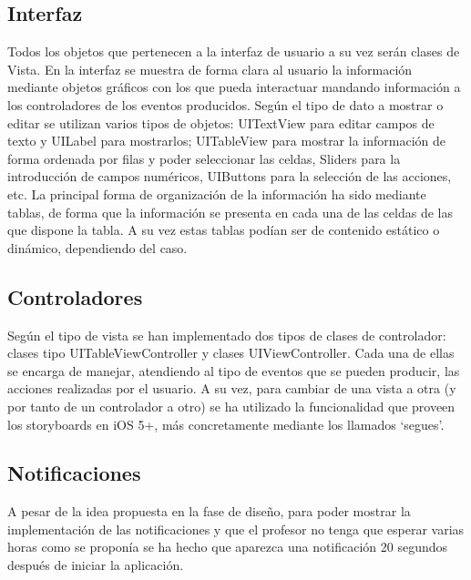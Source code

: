 \documentclass[parskip=half*]{scrartcl}
\begin{document}
\subsection{Interfaz}

Todos los objetos que pertenecen a la interfaz de usuario a su vez ser\'an clases de Vista. En la interfaz se muestra de forma clara al usuario la informaci\'on mediante objetos gr\'aficos con los que pueda interactuar mandando informaci\'on a los controladores de los eventos producidos. Seg\'un el tipo de dato a mostrar o editar se utilizan varios tipos de objetos: UITextView para editar campos de texto y UILabel para mostrarlos; UITableView para mostrar la informaci\'on de forma ordenada por filas y poder seleccionar las celdas, Sliders para la introducci\'on de campos num\'ericos, UIButtons para la selecci\'on de las acciones, etc. La principal forma de organizaci\'on de la informaci\'on ha sido mediante tablas, de forma que la informaci\'on se presenta en cada una de las celdas de las que dispone la tabla. A su vez estas tablas pod\'ian ser de contenido est\'atico o din\'amico, dependiendo del caso.

\subsection{Controladores}

Seg\'un el tipo de vista se han implementado dos tipos de clases de controlador: clases tipo UITableViewController y clases UIViewController. Cada una de ellas se encarga de manejar, atendiendo al tipo de eventos que se pueden producir, las acciones realizadas por el usuario. A su vez, para cambiar de una vista a otra (y por tanto de un controlador a otro) se ha utilizado la funcionalidad que proveen los storyboards en iOS 5+, m\'as concretamente mediante los llamados `segues'.

\subsection{Notificaciones}

A pesar de la idea propuesta en la fase de dise\~no, para poder mostrar la implementaci\'on de las notificaciones y que el profesor no tenga que esperar varias horas como se propon\'ia se ha hecho que aparezca una notificaci\'on 20 segundos despu\'es de iniciar la aplicaci\'on.
\end{document}
